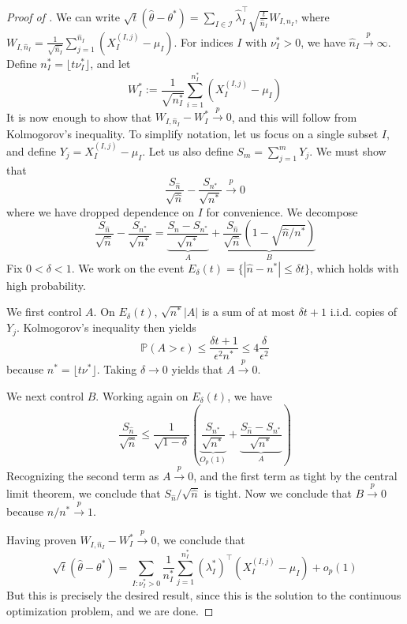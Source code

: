 \documentclass[10pt,a4paper]{amsart}
\newcommand{\p}{\mathbb{P}}
\begin{document}
\begin{proof}[Proof of ]
We can write $\sqrt{t}(\hat{\theta} - \theta^*) = \sum_{I \in \mathcal{I}} \hat{\lambda}_I^\top \sqrt{\frac{t}{\hat{n}_I}} W_{I, \hat{n}_I}$, where $W_{I, \hat{n}_I} = \frac{1}{\sqrt{\hat{n}_I}} \sum_{j=1}^{\hat{n}_I} (X_I^{(I,j)} - \mu_I)$. For indices $I$ with $\nu_I^* > 0$, we have $\hat{n}_I \xrightarrow{p} \infty$. Define $n_I^* = \lfloor t\nu_I^*\rfloor $, and let 
\[
W^*_I:=\frac{1}{\sqrt{n_I^*}}\sum_{i=1}^{n_I^*} (X_I^{(I,j)}-\mu_I)
\]
It is now enough to show that $W_{I,\hat{n}_I}-W^*_I\overset{p}{\to}0$, and this will follow from Kolmogorov's inequality. To simplify notation, let us focus on a single subset $I$, and define $Y_j = X_I^{(I,j)}-\mu_I$. Let us also define $S_m=\sum_{j=1}^m Y_j$. We must show that
\[
\frac{S_{\hat{n}}}{\sqrt{\hat{n}}}-\frac{S_{n^*}}{\sqrt{n^*}}\overset{p}{\to}0
\]
where we have dropped dependence on $I$ for convenience. We decompose
\[
\frac{S_{\hat{n}}}{\sqrt{\hat{n}}}-\frac{S_{n^*}}{\sqrt{n^*}} = \underbrace{\frac{S_{\hat{n}}-S_{n^*}}{\sqrt{n^*}}}_A + \underbrace{\frac{S_{\hat{n}}}{\sqrt{\hat{n}}}\left(1-\sqrt{\hat{n}/n^*}\right)}_B
\]
Fix $0<\delta<1$. We work on the event $E_\delta(t)=\{|\hat{n}-n^*|\leq \delta t\}$, which holds with high probability.

We first control $A$. On $E_\delta(t)$, $\sqrt{n^*}|A|$ is a sum of at most $\delta t+1$ i.i.d. copies of $Y_j$. Kolmogorov's inequality then yields
\[
\p\left(A>\epsilon \right) \leq \frac{\delta t+1}{\epsilon^2 n^*}\leq 4\frac{\delta}{\epsilon^2}
\]
because $n^*=\lfloor t\nu^*\rfloor$. Taking $\delta\to0$ yields that $A\overset{p}{\to}0$.

We next control $B$. Working again on $E_\delta(t)$, we have
\[
\frac{S_{\hat{n}}}{\sqrt{\hat{n}}} \leq \frac{1}{\sqrt{1-\delta}}\left(\underbrace{\frac{S_{n^*}}{\sqrt{n^*}}}_{O_p(1)}  + \underbrace{\frac{S_{\hat{n}}-S_{n^*}}{\sqrt{n^*}}}_A\right) 
\]
Recognizing the second term as $A\overset{p}{\to}0$, and the first term as tight by the central limit theorem, we conclude that $S_{\hat{n}}/\sqrt{\hat{n}}$ is tight. Now we conclude that $B\overset{p}{\to}0$ because $\hat{n}/n^*\overset{p}{\to}1$.

Having proven $W_{I,\hat{n}_I}-W^*_I\overset{p}{\to}0$, we conclude that
\[
\sqrt{t}(\hat{\theta}-\theta^*) = \sum_{I:\nu_I^*>0} \frac{1}{n^*_I} \sum_{j=1}^{n^*_I} (\lambda^*_I)^\top (X_I^{(I,j)}-\mu_I) + o_p(1)
\]
But this is precisely the desired result, since this is the solution to the continuous optimization problem, and we are done.
\end{proof}
\end{document}
